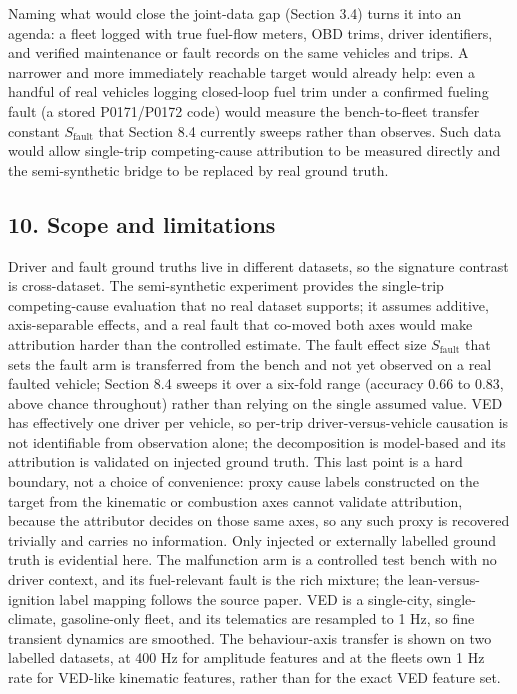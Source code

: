 Naming what would close the joint-data gap (Section 3.4) turns it into
an agenda: a fleet logged with true fuel-flow meters, OBD trims, driver
identifiers, and verified maintenance or fault records on the same
vehicles and trips. A narrower and more immediately reachable target
would already help: even a handful of real vehicles logging closed-loop
fuel trim under a confirmed fueling fault (a stored P0171/P0172 code)
would measure the bench-to-fleet transfer constant \(S_{\text{fault}}\)
that Section 8.4 currently sweeps rather than observes. Such data would
allow single-trip competing-cause attribution to be measured directly
and the semi-synthetic bridge to be replaced by real ground truth.

\subsection{10. Scope and limitations}\label{limits}

Driver and fault ground truths live in different datasets, so the
signature contrast is cross-dataset. The semi-synthetic experiment
provides the single-trip competing-cause evaluation that no real dataset
supports; it assumes additive, axis-separable effects, and a real fault
that co-moved both axes would make attribution harder than the
controlled estimate. The fault effect size \(S_{\text{fault}}\) that
sets the fault arm is transferred from the bench and not yet observed on
a real faulted vehicle; Section 8.4 sweeps it over a six-fold range
(accuracy 0.66 to 0.83, above chance throughout) rather than relying on
the single assumed value. VED has effectively one driver per vehicle, so
per-trip driver-versus-vehicle causation is not identifiable from
observation alone; the decomposition is model-based and its attribution
is validated on injected ground truth. This last point is a hard
boundary, not a choice of convenience: proxy cause labels constructed on
the target from the kinematic or combustion axes cannot validate
attribution, because the attributor decides on those same axes, so any
such proxy is recovered trivially and carries no information. Only
injected or externally labelled ground truth is evidential here. The
malfunction arm is a controlled test bench with no driver context, and
its fuel-relevant fault is the rich mixture; the lean-versus-ignition
label mapping follows the source paper. VED is a single-city,
single-climate, gasoline-only fleet, and its telematics are resampled to
1 Hz, so fine transient dynamics are smoothed. The behaviour-axis
transfer is shown on two labelled datasets, at 400 Hz for amplitude
features and at the fleet\textquotesingle s own 1 Hz rate for VED-like
kinematic features, rather than for the exact VED feature set.

